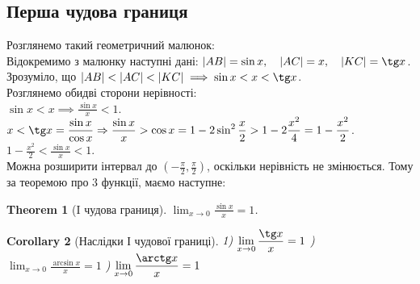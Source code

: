 \documentclass[a4paper, 14pt]{article}
\theoremstyle{theoremdd}
\newtheorem{theorem}{Theorem}[subsection]
\theoremstyle{theoremdd}
\theoremstyle{theoremdd}
\theoremstyle{theoremdd}
\theoremstyle{theoremdd}
\theoremstyle{theoremdd}
\theoremstyle{theoremdd}
\theoremstyle{theoremdd}
\newtheorem{corollary}[theorem]{Corollary}
\begin{document}
\subsection{Перша чудова границя}
Розглянемо такий геометричний малюнок:
\\ \iffalse %
\begin{figure}[H]
\centering
{
\begin{tikzpicture}[scale = 0.5]
\fill[thick, fill = blue!40] (1,0) arc (0:45:1cm) -- (0,0) -- (1,0) -- cycle node[anchor = south west] {$x$};
\draw[thick, ->] (-1.5*3cm,0)--(1.5*3cm,0);
\draw[thick, ->] (0,-1.5*3cm)--(0,1.5*3cm);
\draw[thick] (0,0) circle (1*3cm);
\draw[thick] (0,0)--(1*3,1*3) node[anchor = south west] {$K$};
\draw[thick] (1*3,1*3)--(1*3,0) node[anchor = south west] {$C$};
\draw[thick] ({cos(45)*3},{sin(45)*3})--({cos(45)*3},0) node[anchor = north] {$B$};
\node[anchor = north west] at (0,0) {$0$};
\node[anchor = south] at ({cos(45)*3},{sin(45)*3}) {$A$};
\draw (1pt, 1*3 cm) -- (-1pt, 1*3 cm) node[anchor = south east] {$1$};
\draw (1*3 cm, 1pt) -- (1*3 cm, -1pt) node[anchor = north west] {$1$};
\end{tikzpicture}
}
\caption*{Коло радіуса $1$. Вважаємо поки $x \in \left(0, \dfrac{\pi}{2} \right)$.}
\end{figure}
\fi %
Відокремимо з малюнку наступні дані: $|AB|=\sin x, \quad |AC|=x, \quad |KC|=\tg x$.\\
	Зрозуміло, що $|AB|<|AC|<|KC| \implies \sin x < x < \tg x$.\\
	Розглянемо обидві сторони нерівності:\\
	$\displaystyle \sin x < x \implies \frac{\sin x}{x} < 1$.\\
	$\displaystyle x < \tg x = \frac{\sin x}{\cos x} \Rightarrow \frac{\sin x}{x} > \cos x = 1-2 \sin^2 \frac{x}{2} > 1 - 2 \frac{x^2}{4} = 1 - \frac{x^2}{2}$.\\
	$\displaystyle 1- \frac{x^2}{2}<\frac{\sin x}{x} < 1$.\\
Можна розширити інтервал до $\displaystyle \left(-\frac{\pi}{2},\frac{\pi}{2} \right)$, оскільки нерівність не змінюється. Тому за теоремою про 3 функції, маємо наступне:
\begin{theorem}[I чудова границя]
$\displaystyle \lim_{x \to 0} \frac{\sin x}{x} = 1$.
\end{theorem}



\begin{corollary}[Наслідки І чудової границі]
1) $\displaystyle \lim_{x \to 0} \frac{\tg x}{x} = 1$ ) $\displaystyle \lim_{x \to 0} \frac{\arcsin x}{x} = 1$ ) $\displaystyle \lim_{x \to 0} \frac{\arctg x}{x} = 1$
\end{corollary}
\end{document}
